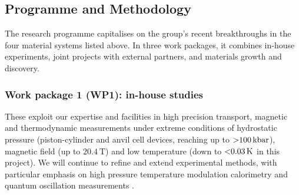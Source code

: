 \subsection*{Programme and Methodology}
\noindent
The research programme capitalises on the group's recent breakthroughs in the four material systems listed above. %
In three work packages, it combines in-house experiments, joint projects with external partners, and materials growth and discovery.







\subsubsection*{Work package 1 (WP1): in-house studies}
\noindent
These exploit our expertise and facilities in high precision transport, magnetic and thermodynamic measurements under extreme conditions of hydrostatic pressure (piston-cylinder and anvil cell devices, reaching up to $\SI{>100}{\kilo\bar}$), magnetic field (up to $\SI{20.4}{\tesla}$) and low temperature (down to $\SI{<0.03}{\kelvin}$ in this project). We will continue to refine and extend experimental methods, with particular emphasis on high pressure temperature modulation calorimetry and quantum oscillation measurements  . %



